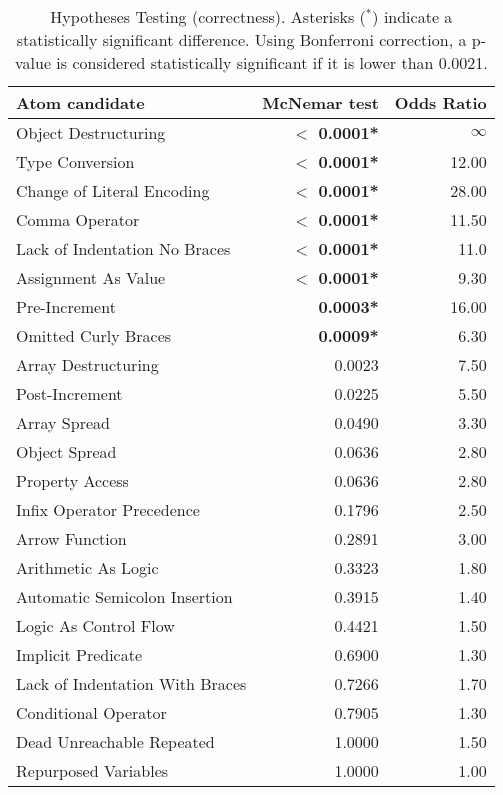 \begin{table}[th!]
\caption{Hypotheses Testing (correctness). Asterisks ($^{*}$) indicate a statistically significant difference. Using Bonferroni correction, a p-value is considered statistically significant if it is lower than 0.0021.}
 \centering
 {\scriptsize 
 \begin{tabular}{lrr}
   \toprule
Atom candidate & McNemar test &      Odds Ratio \\
\midrule
Object Destructuring      &   \textbf{$<$ 0.0001*} & $\infty$ \\
Type Conversion           &   \textbf{$<$ 0.0001*} & 12.00 \\
Change of Literal Encoding   &   \textbf{$<$ 0.0001*} & 28.00 \\
Comma Operator            &   \textbf{$<$ 0.0001*} & 11.50 \\
Lack of Indentation No Braces     &   \textbf{$<$ 0.0001*} &  11.0 \\
Assignment As Value       &   \textbf{$<$ 0.0001*} &  9.30 \\
Pre-Increment              &  \textbf{0.0003*} &    16.00 \\
Omitted Curly Braces      &  \textbf{0.0009*} &  6.30 \\
Array Destructuring       &  0.0023 &     7.50 \\
Post-Increment              &  0.0225 &     5.50 \\
Array Spread              &  0.0490 &    3.30 \\
Object Spread             &  0.0636 &     2.80 \\
Property Access           &  0.0636 &     2.80 \\
Infix Operator Precedence &  0.1796 &     2.50 \\
Arrow Function            &  0.2891 &     3.00 \\
Arithmetic As Logic       &  0.3323 &  1.80 \\
Automatic Semicolon Insertion  &  0.3915 &  1.40 \\
Logic As Control Flow     &  0.4421 &  1.50 \\
Implicit Predicate        &  0.6900 &  1.30 \\
Lack of Indentation With Braces   &  0.7266 &  1.70 \\
Conditional Operator      &  0.7905 &  1.30 \\
Dead Unreachable Repeated &  1.0000 &     1.50 \\
Repurposed Variables      &   1.0000 &     1.00 \\
\bottomrule
\end{tabular}
}
\label{tab:repeated:misunderstanding}
\end{table}



